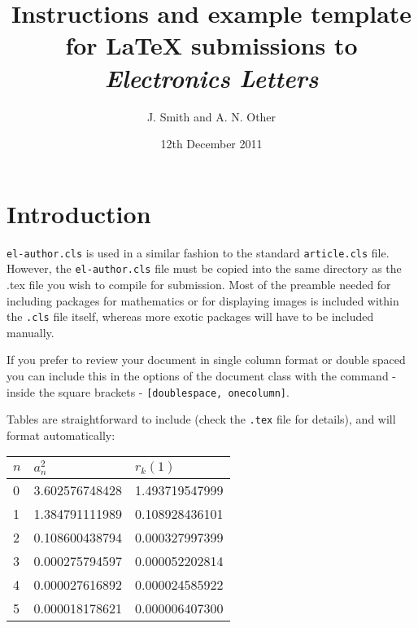 \documentclass[twocolumn]{el-author}
\date{12th December 2011}
\begin{document}
\title{Instructions and example template for \LaTeX{} submissions to \emph{Electronics Letters}}

\author{J. Smith and A. N. Other}


\maketitle

\section{Introduction}

\verb"el-author.cls" is used in a similar fashion to the standard \verb"article.cls" file. However, the \verb"el-author.cls" file must be copied into the same directory as the .tex file you wish to compile for submission. Most of the preamble needed for including packages for mathematics or for displaying images is included within the \verb".cls" file itself, whereas more exotic packages will have to be included manually.

If you prefer to review your document in single column format or double spaced you can include this in the options of the document class with the command - inside the square brackets - \verb"[doublespace, onecolumn]".

Tables are straightforward to include (check the \verb".tex" file for details), and will format automatically:
\begin{table}[h]
{\begin{tabular}{|l|l|l|}\hline
$n$ & $a_{n}^{2}$ & $r_{k}(1)$\\\hline
0 & 3.602576748428 & 1.493719547999\\\hline
1 & 1.384791111989 & 0.108928436101\\\hline
2 & 0.108600438794 & 0.000327997399\\\hline
3 & 0.000275794597 & 0.000052202814\\\hline
4 & 0.000027616892 & 0.000024585922\\\hline
5 & 0.000018178621 & 0.000006407300\\\hline
\end{tabular}}{}
\end{table}
\end{document}
